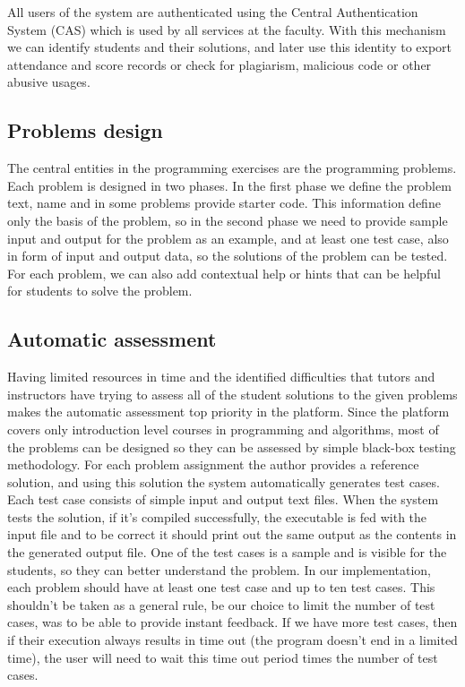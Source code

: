 \documentclass{llncs}
\begin{document}
All users of the system are authenticated using the Central Authentication
System (CAS) which is used by all services at the faculty. With this mechanism
we can identify students and their solutions, and later use this identity to
export attendance and score records or check for plagiarism, malicious code or
other abusive usages.

\subsection{Problems design}

The central entities in the programming exercises are the programming problems.
Each problem is designed in two phases. In the first phase we define the problem
text, name and in some problems provide starter code. This information define
only the basis of the problem, so in the second phase we need to provide sample
input and output for the problem as an example, and at least one test case, also
in form of input and output data, so the solutions of the problem can be tested.
For each problem, we can also add contextual help or hints that can be helpful
for students to solve the problem.

\subsection{Automatic assessment}

Having limited resources in time and the identified difficulties that tutors and
instructors have trying to assess all of the student solutions to the given
problems makes the automatic assessment top priority in the platform. Since the
platform covers only introduction level courses in programming and algorithms,
most of the problems can be designed so they can be assessed by simple black-box
testing methodology. For each problem assignment the author provides a reference
solution, and using this solution the system automatically generates test cases.
Each test case consists of simple input and output text files. When the system
tests the solution, if it's compiled successfully, the executable is fed with
the input file and to be correct it should print out the same output as the
contents in the generated output file. One of the test cases is a sample and is
visible for the students, so they can better understand the problem. In our
implementation, each problem should have at least one test case and up to ten
test cases. This shouldn't be taken as a general rule, be our choice to limit
the number of test cases, was to be able to provide instant feedback. If we have
more test cases, then if their execution always results in time out (the program
doesn't end in a limited time), the user will need to wait this time out period
times the number of test cases.
\end{document}
